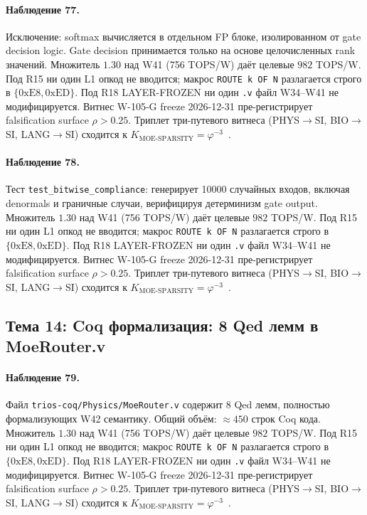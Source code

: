 \paragraph{Наблюдение 77.} Исключение: softmax вычисляется в отдельном FP блоке, изолированном от gate decision logic. Gate decision принимается только на основе целочисленных rank значений. Множитель $1{.}30$ над W41 (756 TOPS/W) даёт целевые $982$ TOPS/W. Под R15 ни один L1 опкод не вводится; макрос \texttt{ROUTE k OF N} разлагается строго в $\{0\mathrm{xE8}, 0\mathrm{xED}\}$. Под R18 LAYER-FROZEN ни один \texttt{.v} файл W34--W41 не модифицируется. Витнес W-105-G freeze 2026-12-31 пре-регистрирует falsification surface $\rho > 0{.}25$. Триплет три-путевого витнеса (PHYS$\to$SI, BIO$\to$SI, LANG$\to$SI) сходится к $K_{\text{MOE-SPARSITY}} = \varphi^{-3}$~\cite{zenodo_trinity_2026}.

\paragraph{Наблюдение 78.} Тест \texttt{test\_bitwise\_compliance}: генерирует 10000 случайных входов, включая denormals и граничные случаи, верифицируя детерминизм gate output. Множитель $1{.}30$ над W41 (756 TOPS/W) даёт целевые $982$ TOPS/W. Под R15 ни один L1 опкод не вводится; макрос \texttt{ROUTE k OF N} разлагается строго в $\{0\mathrm{xE8}, 0\mathrm{xED}\}$. Под R18 LAYER-FROZEN ни один \texttt{.v} файл W34--W41 не модифицируется. Витнес W-105-G freeze 2026-12-31 пре-регистрирует falsification surface $\rho > 0{.}25$. Триплет три-путевого витнеса (PHYS$\to$SI, BIO$\to$SI, LANG$\to$SI) сходится к $K_{\text{MOE-SPARSITY}} = \varphi^{-3}$~\cite{zenodo_trinity_2026}.

\subsection{Тема 14: Coq формализация: 8 Qed лемм в MoeRouter.v}

\paragraph{Наблюдение 79.} Файл \texttt{trios-coq/Physics/MoeRouter.v} содержит 8 Qed лемм, полностью формализующих W42 семантику. Общий объём: $\approx 450$ строк Coq кода. Множитель $1{.}30$ над W41 (756 TOPS/W) даёт целевые $982$ TOPS/W. Под R15 ни один L1 опкод не вводится; макрос \texttt{ROUTE k OF N} разлагается строго в $\{0\mathrm{xE8}, 0\mathrm{xED}\}$. Под R18 LAYER-FROZEN ни один \texttt{.v} файл W34--W41 не модифицируется. Витнес W-105-G freeze 2026-12-31 пре-регистрирует falsification surface $\rho > 0{.}25$. Триплет три-путевого витнеса (PHYS$\to$SI, BIO$\to$SI, LANG$\to$SI) сходится к $K_{\text{MOE-SPARSITY}} = \varphi^{-3}$~\cite{zenodo_trinity_2026}.

